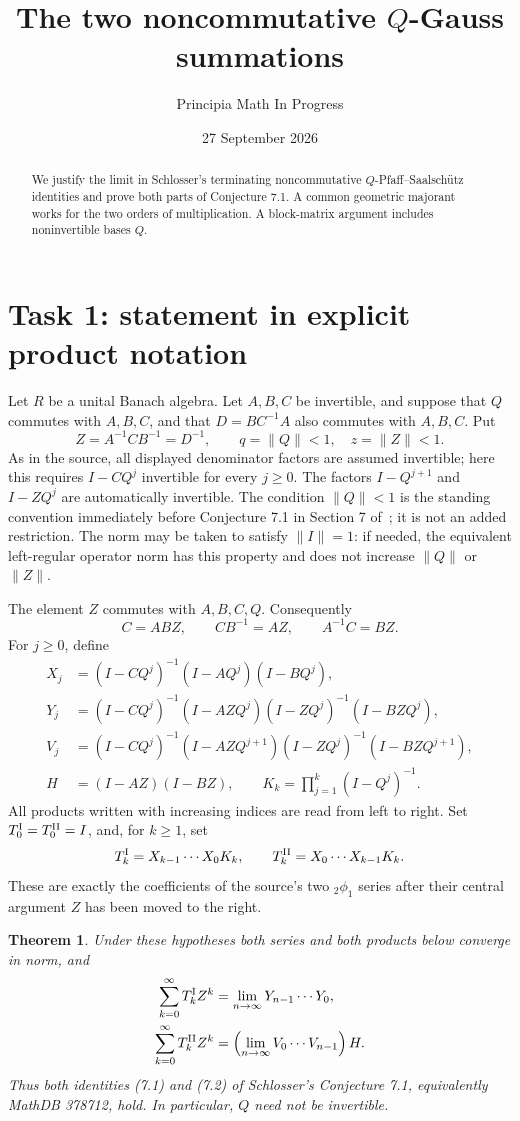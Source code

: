 \documentclass[11pt]{article}
\title{The two noncommutative $Q$-Gauss summations}
\author{Principia Math In Progress}
\date{27 September 2026}
\newtheorem{theorem}{Theorem}
\newcommand{\norm}[1]{\lVert#1\rVert}
\begin{document}
\maketitle
\begin{abstract}
We justify the limit in Schlosser's terminating noncommutative
$Q$-Pfaff--Saalsch\"utz identities and prove both parts of Conjecture 7.1.
A common geometric majorant works for the two orders of multiplication.
A block-matrix argument includes noninvertible bases $Q$.
\end{abstract}

\section*{Task 1: statement in explicit product notation}
Let $R$ be a unital Banach algebra. Let $A,B,C$ be invertible, and suppose
that $Q$ commutes with $A,B,C$, and that $D=BC^{-1}A$ also commutes with
$A,B,C$. Put
\[
 Z=A^{-1}CB^{-1}=D^{-1},\qquad q=\norm Q<1,\quad z=\norm Z<1.
\]
As in the source, all displayed denominator factors are assumed
invertible; here this requires $I-CQ^j$ invertible for every $j\geq0$.
The factors $I-Q^{j+1}$ and $I-ZQ^j$ are automatically invertible.
The condition $\norm Q<1$ is the standing convention immediately before
Conjecture 7.1 in Section 7 of~\cite{S}; it is not an added restriction.
The norm may be taken to satisfy $\norm I=1$: if needed, the equivalent
left-regular operator norm has this property and does not increase
$\norm Q$ or $\norm Z$.

The element $Z$ commutes with $A,B,C,Q$. Consequently
\[
 C=ABZ,\qquad CB^{-1}=AZ,\qquad A^{-1}C=BZ.
\]
For $j\geq0$, define
\begin{align*}
 X_j&=(I-CQ^j)^{-1}(I-AQ^j)(I-BQ^j),\\
 Y_j&=(I-CQ^j)^{-1}(I-AZQ^j)(I-ZQ^j)^{-1}(I-BZQ^j),\\
 V_j&=(I-CQ^j)^{-1}(I-AZQ^{j+1})(I-ZQ^j)^{-1}(I-BZQ^{j+1}),\\
 H&=(I-AZ)(I-BZ),\qquad
 K_k=\prod_{j=1}^k(I-Q^j)^{-1}.
\end{align*}
All products written with increasing indices are read from left to right.
Set $T_0^{\rm I}=T_0^{\rm II}=I$, and, for $k\geq1$, set
\[
 T_k^{\rm I}=X_{k-1}\cdots X_0K_k,\qquad
 T_k^{\rm II}=X_0\cdots X_{k-1}K_k.
\]
These are exactly the coefficients of the source's two ${}_2\phi_1$
series after their central argument $Z$ has been moved to the right.

\begin{theorem}\label{main}
Under these hypotheses both series and both products below converge in
norm, and
\begin{align}
 \sum_{k=0}^\infty T_k^{\rm I}Z^k
   &=\lim_{n\to\infty}Y_{n-1}\cdots Y_0,\label{I}\\
 \sum_{k=0}^\infty T_k^{\rm II}Z^k
   &=\left(\lim_{n\to\infty}V_0\cdots V_{n-1}\right)H.\label{II}
\end{align}
Thus both identities (7.1) and (7.2) of Schlosser's Conjecture 7.1,
equivalently MathDB 378712, hold. In particular, $Q$ need not be invertible.
\end{theorem}
\end{document}
